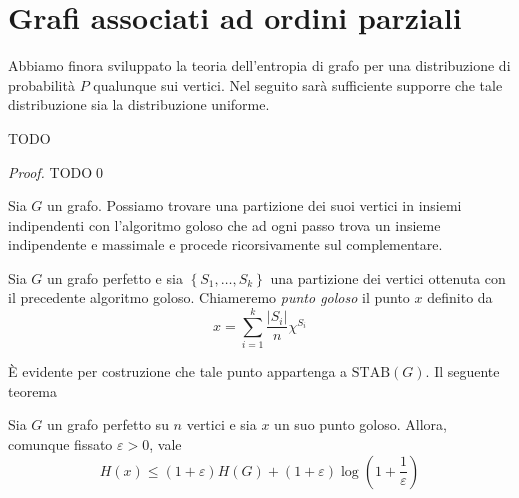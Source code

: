 \section{Grafi associati ad ordini parziali}

Abbiamo finora sviluppato la teoria dell'entropia di grafo per una distribuzione di probabilità \(P\) qualunque sui vertici. Nel seguito sarà sufficiente supporre che tale distribuzione sia la distribuzione uniforme.

\begin{lemma}[Chvatál]
  TODO
\end{lemma}
\begin{proof}
  TODO\qed
\end{proof}

Sia \(G\) un grafo. Possiamo trovare una partizione dei suoi vertici in insiemi indipendenti con l'algoritmo goloso che ad ogni passo trova un insieme indipendente e massimale e procede ricorsivamente sul complementare.
\begin{definition}
	Sia \(G\) un grafo perfetto e sia \(\left\{S_1,\dots,S_k\right\}\) una partizione dei vertici ottenuta con il precedente algoritmo goloso. Chiameremo \emph{punto goloso} il punto \(x\) definito da
	\[x=\sum_{i=1}^k\frac{|S_i|}{n}\chi^{S_i}\]
\end{definition}
È evidente per costruzione che tale punto appartenga a \(\text{STAB}(G)\). Il seguente teorema
\begin{theorem}
	Sia \(G\) un grafo perfetto su \(n\) vertici e sia \(x\) un suo punto goloso. Allora, comunque fissato \(\varepsilon>0\), vale
	\[H(x)\le(1+\varepsilon)H(G)+(1+\varepsilon)\log\left(1+\frac{1}{\varepsilon}\right)\]
\end{theorem}
